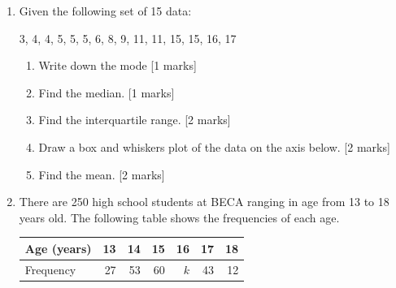 \documentclass[12pt, twoside]{article}
\begin{document}
\begin{enumerate}
  \newpage
  \item Given the following set of 15 data:
    \begin{center}
    3, 4, 4, 5, 5, 5, 6, 8, 9, 11, 11, 15, 15, 16, 17
  \end{center}
  \begin{enumerate}
    \item Write down the mode \hfill [1 marks] \vspace{1cm}
    \item Find the median. \hfill [1 marks] \vspace{1.5cm}
    \item Find the interquartile range. \hfill [2 marks] \vspace{3cm}
    \item Draw a box and whiskers plot of the data on the axis below. \hfill [2 marks] \vspace{1cm}
      \begin{center}
      \end{center} \vspace{1cm}
      \item Find the mean. \hfill [2 marks]
    \end{enumerate}

\newpage

  \item There are 250 high school students at BECA ranging in age from 13 to 18 years old. The following table shows the frequencies of each age.
    \begin{center}
    \begin{tabular}{|l|r|r|r|r|r|r|}
      \hline
      Age (years) & 13 & 14 & 15 & 16 & 17 & 18\\ 
      \hline 
      Frequency & 27 & 53 & 60 & $k$ & 43 & 12\\ 
      \hline 
      \end{tabular}
    \end{center}


\end{enumerate}
\end{document}
